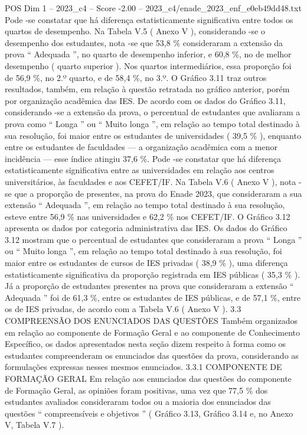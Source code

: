 \begin{textsample}{POS Dim 1 – 2023\_c4 – Score -2.00 – 2023\_c4/enade\_2023\_enf\_e0eb49dd48.txt}
Pode -se constatar que há diferença estatisticamente significativa entre todos os quartos de desempenho.
Na Tabela V.5 ( Anexo V ), considerando -se o desempenho dos estudantes, nota -se que 53,8 \% consideraram a extensão da prova “ Adequada ”, no quarto de desempenho inferior, e 60,8 \%, no de melhor desempenho ( quarto superior ).
Nos quartos intermediários, essa proporção foi de 56,9 \%, no 2.º quarto, e de 58,4 \%, no 3.º.
O Gráfico 3.11 traz outros resultados, também, em relação à questão retratada no gráfico anterior, porém por organização acadêmica das IES.
De acordo com os dados do Gráfico 3.11, considerando -se a extensão da prova, o percentual de estudantes que avaliaram a prova como “ Longa ” ou “ Muito longa ”, em relação ao tempo total destinado à sua resolução, foi maior entre os estudantes de universidades ( 39,5 \% ), enquanto entre os estudantes de faculdades — a organização acadêmica com a menor incidência — esse índice atingiu 37,6 \%.
Pode -se constatar que há diferença estatisticamente significativa entre as universidades em relação aos centros universitários, às faculdades e aos CEFET/IF.
Na Tabela V.6 ( Anexo V ), nota -se que a proporção de presentes, na prova do Enade 2023, que consideraram a sua extensão “ Adequada ”, em relação ao tempo total destinado à sua resolução, esteve entre 56,9 \% nas universidades e 62,2 \% nos CEFET/IF.
O Gráfico 3.12 apresenta os dados por categoria administrativa das IES.
Os dados do Gráfico 3.12 mostram que o percentual de estudantes que consideraram a prova “ Longa ” ou “ Muito longa ”, em relação ao tempo total destinado à sua resolução, foi maior entre os estudantes de cursos de IES privadas ( 38,9 \% ), uma diferença estatisticamente significativa da proporção registrada em IES públicas ( 35,3 \% ).
Já a proporção de estudantes presentes na prova que consideraram a extensão “ Adequada ” foi de 61,3 \%, entre os estudantes de IES públicas, e de 57,1 \%, entre os de IES privadas, de acordo com a Tabela V.6 ( Anexo V ). 3.3 COMPREENSÃO DOS ENUNCIADOS DAS QUESTÕES Também organizados em relação ao componente de Formação Geral e ao componente de Conhecimento Específico, os dados apresentados nesta seção dizem respeito à forma como os estudantes compreenderam os enunciados das questões da prova, considerando as formulações expressas nesses mesmos enunciados. 3.3.1 COMPONENTE DE FORMAÇÃO GERAL Em relação aos enunciados das questões do componente de Formação Geral, as opiniões foram positivas, uma vez que 77,5 \% dos estudantes avaliados consideraram todos ou a maioria dos enunciados das questões “ compreensíveis e objetivos ” ( Gráfico 3.13, Gráfico 3.14 e, no Anexo V, Tabela V.7 ).

\end{textsample}
